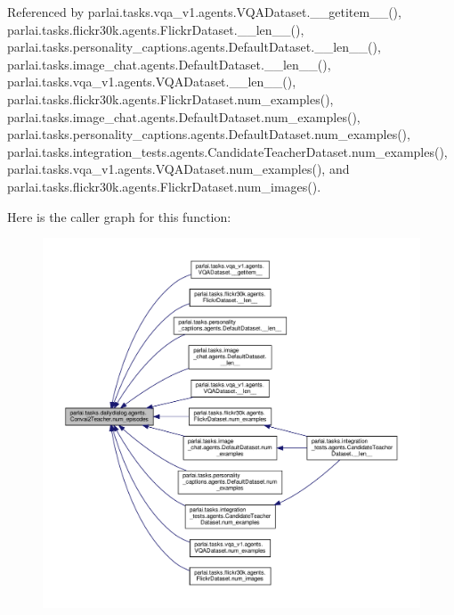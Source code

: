 Referenced by parlai.\+tasks.\+vqa\+\_\+v1.\+agents.\+V\+Q\+A\+Dataset.\+\_\+\+\_\+getitem\+\_\+\+\_\+(), parlai.\+tasks.\+flickr30k.\+agents.\+Flickr\+Dataset.\+\_\+\+\_\+len\+\_\+\+\_\+(), parlai.\+tasks.\+personality\+\_\+captions.\+agents.\+Default\+Dataset.\+\_\+\+\_\+len\+\_\+\+\_\+(), parlai.\+tasks.\+image\+\_\+chat.\+agents.\+Default\+Dataset.\+\_\+\+\_\+len\+\_\+\+\_\+(), parlai.\+tasks.\+vqa\+\_\+v1.\+agents.\+V\+Q\+A\+Dataset.\+\_\+\+\_\+len\+\_\+\+\_\+(), parlai.\+tasks.\+flickr30k.\+agents.\+Flickr\+Dataset.\+num\+\_\+examples(), parlai.\+tasks.\+image\+\_\+chat.\+agents.\+Default\+Dataset.\+num\+\_\+examples(), parlai.\+tasks.\+personality\+\_\+captions.\+agents.\+Default\+Dataset.\+num\+\_\+examples(), parlai.\+tasks.\+integration\+\_\+tests.\+agents.\+Candidate\+Teacher\+Dataset.\+num\+\_\+examples(), parlai.\+tasks.\+vqa\+\_\+v1.\+agents.\+V\+Q\+A\+Dataset.\+num\+\_\+examples(), and parlai.\+tasks.\+flickr30k.\+agents.\+Flickr\+Dataset.\+num\+\_\+images().

Here is the caller graph for this function\+:
\nopagebreak
\begin{figure}[H]
\begin{center}
\leavevmode
\includegraphics[width=350pt]{classparlai_1_1tasks_1_1dailydialog_1_1agents_1_1Convai2Teacher_a2e260f4477f6fd9ec11a1a1663e32bef_icgraph}
\end{center}
\end{figure}
\mbox{\label{classparlai_1_1tasks_1_1dailydialog_1_1agents_1_1Convai2Teacher_a6060e79bfc569e66d1c36af19522ed79}} 
